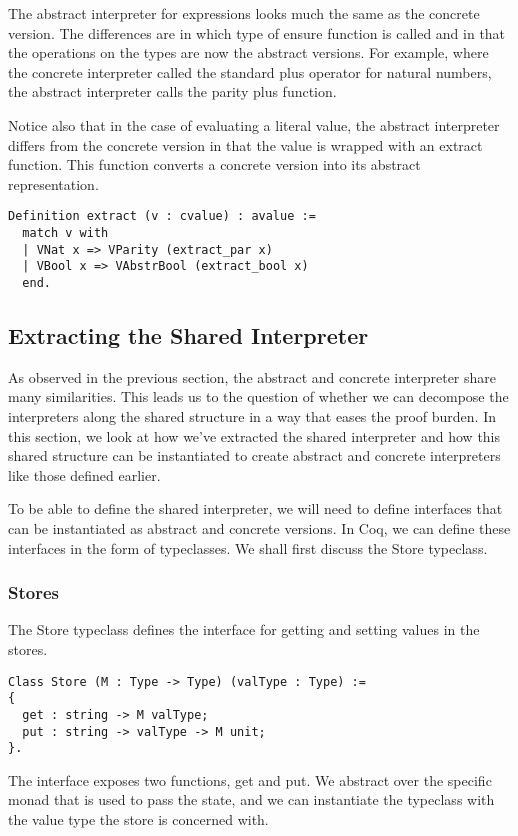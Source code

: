 The abstract interpreter for expressions looks much the same as the concrete
version. The differences are in which type of ensure function is called and in
that the operations on the types are now the abstract versions. For example,
where the concrete interpreter called the standard plus operator for natural
numbers, the abstract interpreter calls the parity plus function.

Notice also that in the case of evaluating a literal value, the abstract
interpreter differs from the concrete version in that the value is wrapped with
an extract function. This function converts a concrete version into its
abstract representation.

\begin{verbatim}
Definition extract (v : cvalue) : avalue :=
  match v with
  | VNat x => VParity (extract_par x)
  | VBool x => VAbstrBool (extract_bool x)
  end.
\end{verbatim}

\subsection{Extracting the Shared Interpreter}\label{sec:shared_interpreter}
As observed in the previous section, the abstract and concrete interpreter
share many similarities. This leads us to the question of whether we can
decompose the interpreters along the shared structure in a way that eases the
proof burden. In this section, we look at how we've extracted the shared
interpreter and how this shared structure can be instantiated to create
abstract and concrete interpreters like those defined earlier.

To be able to define the shared interpreter, we will need to define interfaces
that can be instantiated as abstract and concrete versions. In Coq, we can
define these interfaces in the form of typeclasses. We shall first discuss the
Store typeclass.

\subsubsection{Stores}
The Store typeclass defines the interface for getting and setting values in the
stores. 
\begin{verbatim}
Class Store (M : Type -> Type) (valType : Type) :=
{
  get : string -> M valType;
  put : string -> valType -> M unit;
}.
\end{verbatim}

The interface exposes two functions, get and put. We abstract over the specific
monad that is used to pass the state, and we can instantiate the typeclass with
the value type the store is concerned with.

